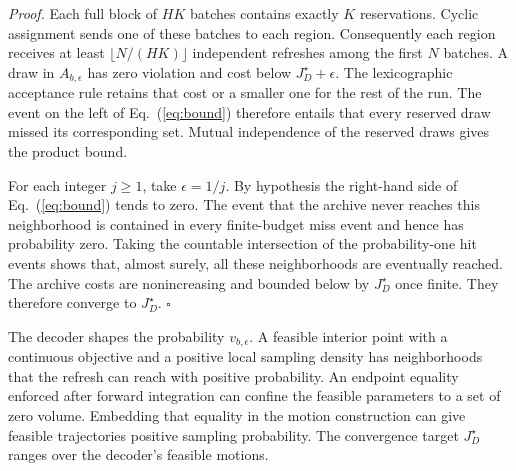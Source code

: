 \textit{Proof.} Each full block of $HK$ batches contains exactly $K$ reservations. Cyclic assignment sends one of these batches to each region. Consequently each region receives at least $\lfloor N/(HK)\rfloor$ independent refreshes among the first $N$ batches. A draw in $A_{b,\epsilon}$ has zero violation and cost below $J_D^\star+\epsilon$. The lexicographic acceptance rule retains that cost or a smaller one for the rest of the run. The event on the left of Eq.~(\ref{eq:bound}) therefore entails that every reserved draw missed its corresponding set. Mutual independence of the reserved draws gives the product bound.

For each integer $j\ge1$, take $\epsilon=1/j$. By hypothesis the right-hand side of Eq.~(\ref{eq:bound}) tends to zero. The event that the archive never reaches this neighborhood is contained in every finite-budget miss event and hence has probability zero. Taking the countable intersection of the probability-one hit events shows that, almost surely, all these neighborhoods are eventually reached. The archive costs are nonincreasing and bounded below by $J_D^\star$ once finite. They therefore converge to $J_D^\star$. \hfill$\square$

The decoder shapes the probability $v_{b,\epsilon}$. A feasible interior point with a continuous objective and a positive local sampling density has neighborhoods that the refresh can reach with positive probability. An endpoint equality enforced after forward integration can confine the feasible parameters to a set of zero volume. Embedding that equality in the motion construction can give feasible trajectories positive sampling probability. The convergence target $J_D^\star$ ranges over the decoder's feasible motions.

